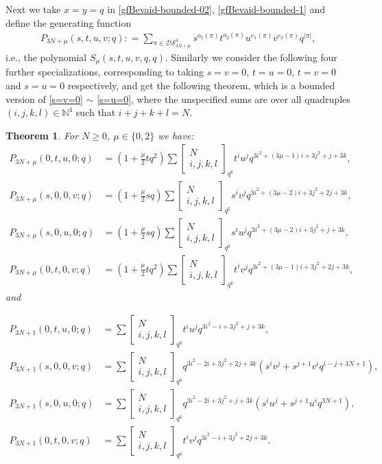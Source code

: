 \documentclass[12pt]{amsart}
\numberwithin{equation}{section}
\theoremstyle{plain}
\newtheorem{theorem}{Theorem}[section]
\theoremstyle{definition}
\newcommand{\N}{\mathbb{N}}
\newcommand\qbin[3]{\left[\begin{matrix} #1 \\ #2 \end{matrix} \right]_{#3}}
\begin{document}
Next we take $x=y=q$ in \eqref{gfBevaid-bounded-02}, \eqref{gfBevaid-bounded-1} and 
define the generating function
\begin{align}\label{GF-bounded}
P_{3N+\mu}(s,t,u,v;q):
=\sum\limits_{\pi\in\mathcal{DS}_{3N+\mu}^3}s^{o_1(\pi)}t^{o_2(\pi)}u^{e_1(\pi)}v^{e_2(\pi)}q^{|\pi|},
\end{align}
i.e., the polynomial $S_\mu(s,t,u,v, q,q)$.
Similarly we consider the following four further specializations, corresponding to taking $s=v=0$, $t=u=0$, $t=v=0$ and $s=u=0$ respectively, and get the following theorem, which is a 
bounded version of \eqref{s=v=0} $\sim$ \eqref{s=u=0}, where
 the unspecified sums are over all quadruples $(i,j,k,l)\in \N^4$ such that $i+j+k+l=N$.

\begin{theorem}\label{bunewcomp-refine-bounded}
For $N\geq 0$, $\mu\in\{0,2\}$ we have:
\begin{align}
\label{s=v=0-b}

P_{3N+\mu}(0,t,u,0;q)&=
\left(1+\frac{\mu}{2} tq^2\right)\sum

\qbin{N}{i,j,k,l}{q^6}t^{i}u^{j}q^{3i^2+(3\mu-1)i+3j^2+j+3k},\\
\label{t=u=0-b}

P_{3N+\mu}(s,0,0,v;q)&=\left(1+\frac{\mu}{2} sq\right)\sum
\qbin{N}{i,j,k,l}{q^6}s^{i}v^{j}q^{3i^2+(3\mu-2)i+3j^2+2j+3k},\\
\label{t=v=0-b}

P_{3N+\mu}(s,0,u,0;q)&=\left(1+\frac{\mu}{2} sq\right)\sum
\qbin{N}{i,j,k,l}{q^6}s^{i}u^{j}q^{3i^2+(3\mu-2)i+3j^2+j+3k},\\
\label{s=u=0-b}

P_{3N+\mu}(0,t,0,v;q)&=\left(1+\frac{\mu}{2} tq^2\right)\sum
\qbin{N}{i,j,k,l}{q^6}t^{i}v^{j}q^{3i^2+\left(3\mu-1\right)i+3j^2+2j+3k},
\end{align}
and




\begin{align}
\label{s=v=0-b-1}

P_{3N+1}(0,t,u,0;q)&=\sum

\qbin{N}{i,j,k,l}{q^6}t^{i}u^{j}q^{3i^2-i+3j^2+j+3k},\\
\label{t=u=0-b-1}

P_{3N+1}(s,0,0,v;q)&=\sum\qbin{N}{i,j,k,l}{q^6}q^{3i^2-2i+3j^2+2j+3k}
\left(s^{i}v^{j}+s^{j+1}v^{i}q^{i-j+3N+1}\right),\\
\label{t=v=0-b-1}

P_{3N+1}(s,0,u,0;q)&=\sum\qbin{N}{i,j,k,l}{q^6}q^{3i^2-2i+3j^2+j+3k}\left(s^{i}u^{j}+s^{j+1}u^{i}q^{3N+1}\right),\\
\label{s=u=0-b-1}

P_{3N+1}(0,t,0,v;q)&=\sum
\qbin{N}{i,j,k,l}{q^6}t^{i}v^{j}q^{3i^2-i+3j^2+2j+3k}.
\end{align}
\end{theorem}
\end{document}
